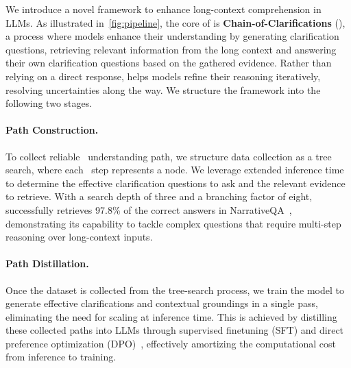 We introduce a novel framework \method to enhance long-context comprehension in LLMs. 
As illustrated in~\cref{fig:pipeline}, the core of \method is \textbf{Chain-of-Clarifications} (\coc), a process where models enhance their understanding by generating clarification questions, retrieving relevant information from the long context and answering their own clarification questions based on the gathered evidence. Rather than relying on a direct response, \coc helps models refine their reasoning iteratively, resolving uncertainties along the way. We structure the framework into the following two stages.

\paragraph{\coc Path Construction.} To collect reliable \coc~understanding path, we structure data collection as a tree search, where each \coc~step represents a node. We leverage extended inference time to determine the effective clarification questions to ask and the relevant evidence to retrieve. With a search depth of three and a branching factor of eight, \method successfully retrieves 97.8\% of the correct answers in NarrativeQA~\cite{kocisky-etal-2018-narrativeqa}, demonstrating its capability to tackle complex questions that require multi-step reasoning over long-context inputs.

\paragraph{\coc Path Distillation.} Once the dataset is collected from the tree-search process, we train the model to generate effective clarifications and contextual groundings in a single pass, eliminating the need for scaling at inference time. This is achieved by distilling these collected paths into LLMs through supervised finetuning (SFT) and direct preference optimization (DPO)~\cite{rafailov2024direct}, effectively amortizing the computational cost from inference to training.


